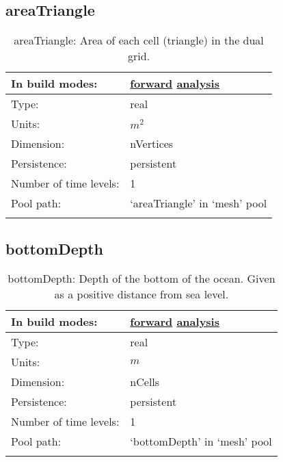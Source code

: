 \subsection[areaTriangle]{areaTriangle}
\label{subsec:var_sec_mesh_areaTriangle}
\begin{center}
\begin{longtable}{| p{2.0in} | p{4.0in} |}
        \hline 
        In build modes: & \hyperref[subsec:forward_var_tab_mesh]{forward} \hyperref[subsec:analysis_var_tab_mesh]{analysis} \\
        \hline 
        Type: & real \\
        \hline 
        Units: & $m^2$ \\
        \hline 
        Dimension: & nVertices \\
        \hline 
        Persistence: & persistent \\
        \hline 
        Number of time levels: & 1 \\
        \hline 
            Pool path: & `areaTriangle' in `mesh' pool \\
		 \hline 
    \caption{areaTriangle: Area of each cell (triangle) in the dual grid.}
\end{longtable}
\end{center}
\subsection[bottomDepth]{bottomDepth}
\label{subsec:var_sec_mesh_bottomDepth}
\begin{center}
\begin{longtable}{| p{2.0in} | p{4.0in} |}
        \hline 
        In build modes: & \hyperref[subsec:forward_var_tab_mesh]{forward} \hyperref[subsec:analysis_var_tab_mesh]{analysis} \\
        \hline 
        Type: & real \\
        \hline 
        Units: & $m$ \\
        \hline 
        Dimension: & nCells \\
        \hline 
        Persistence: & persistent \\
        \hline 
        Number of time levels: & 1 \\
        \hline 
            Pool path: & `bottomDepth' in `mesh' pool \\
		 \hline 
    \caption{bottomDepth: Depth of the bottom of the ocean. Given as a positive distance from sea level.}
\end{longtable}
\end{center}
